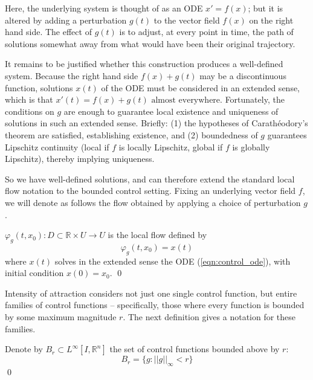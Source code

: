 Here, the underlying system is thought of as an ODE $x'=f(x)$; but it is altered by adding a perturbation $g(t)$ to the vector field $f(x)$ on the right hand side. The effect of $g(t)$ is to adjust, at every point in time, the path of solutions somewhat away from what would have been their original trajectory. 

It remains to be justified whether this construction produces a well-defined system. Because the right hand side $f(x) + g(t)$ may be a discontinuous function, solutions $x(t)$ of the ODE must be considered in an extended sense, which is that $x'(t) = f(x) + g(t) \text{ almost everywhere.}$ Fortunately, the conditions on $g$ are enough to guarantee local existence and uniqueness of solutions in such an extended sense. Briefly: (1) the hypotheses of Carath\'eodory's theorem are satisfied, establishing existence, and (2) boundedness of $g$ guarantees Lipschitz continuity (local if $f$ is locally Lipschitz, global if $f$ is globally Lipschitz), thereby implying uniqueness. 

So we have well-defined solutions, and can therefore extend the standard local flow notation to the bounded control setting. Fixing an underlying vector field $f$, we will denote as follows the flow obtained by applying a choice of perturbation $g$.

\begin{definition} 
	$\varphi_g(t, x_0): D \subset \mathbb{R} \times U \to U$ is the local flow defined by $$\varphi_g(t, x_0) = x(t)$$ where $x(t)$ solves in the extended sense the ODE (\ref{eqn:control_ode}), with initial condition $x(0) = x_0$. \qed
\end{definition}

Intensity of attraction considers not just one single control function, but entire families of control functions -- specifically, those where every function is bounded by some maximum magnitude $r$. %
The next definition gives a notation for these families.


\begin{definition}
	Denote by $B_r \subset L^\infty[I, \mathbb{R}^n]$ the set of control functions bounded above by $r$:
	$$B_r = \{g  : ||g||_\infty < r\}$$ \qed
\end{definition}


